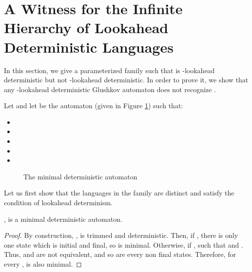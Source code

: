 \documentclass{llncs}
\begin{document}
\section{A Witness for the Infinite Hierarchy of Lookahead Deterministic Languages}\label{se:kld_witness}

	In this section, we give a parameterized family  such that  is -lookahead deterministic but not -lookahead deterministic.
	In order to prove it, we show that any -lookahead deterministic Glushkov automaton does not recognize .

	Let  and let  be the automaton (given in Figure \ref{fg:Aj}) such that:
	\begin{itemize}
		\item 
		\item 
		\item 
		\item 
		\item 
	\end{itemize}

\begin{figure}[H]
	\centering
	
	
	\caption{The minimal deterministic automaton }
	\label{fg:Aj}
\end{figure}	

Let us first show that the languages in the family are distinct and satisfy the condition of lookahead determinism.

\begin{proposition}
	,  is a minimal deterministic automaton.
\end{proposition}
\begin{proof}
	By construction, ,  is trimmed and deterministic.
	Then, if , there is only one state which is initial and final, so  is minimal.
	Otherwise, if ,  such that  and .
	Thus,  and  are not equivalent, and so are every non final states.
	Therefore, for every ,  is also minimal.
\end{proof}
\end{document}
